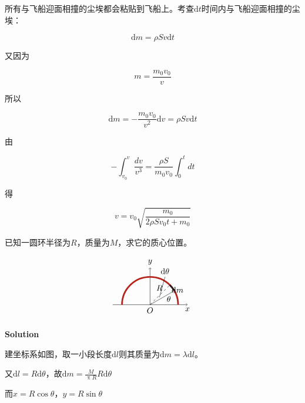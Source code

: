 \documentclass[
	12pt, %
	a4paper, %
]{myLegrandOrangeBook}
\newcommand{\rmd}{\mathrm{d}}
\begin{document}
    所有与飞船迎面相撞的尘埃都会粘贴到飞船上。考查\(\rmd t\)时间内与飞船迎面相撞的尘埃：

    \[
        \rmd m = \rho Sv\rmd t
    \]

    又因为

    \[
        m = \frac{m_0v_0}{v}
    \]

    所以

    \[
        \rmd m = -\frac{m_0v_0}{v^2} \rmd v = \rho Sv\rmd t
    \]

    由

    $$
        -\int_{v_0}^v \frac{d v}{v^3}=\frac{\rho S}{m_0 v_0} \int_0^t d t
    $$

    得

    $$
        v=v_0\sqrt{\frac{m_0}{2 \rho S v_0 t+m_0}}
    $$

    \begin{exercise}

    已知一圆环半径为\(R\)，质量为\(M\)，求它的质心位置。

    \[
        \centering
        \begin{tikzpicture}[scale=0.8]
            \coordinate[label=below:$x$] (x) at (2,0);
            \coordinate[label=above:$y$] (y) at (0,2);
            \coordinate[label=below:$O$] (O) at (0,0);
            \draw[->] (O) -- (y);
            \draw[->] (-2,0) -- (x);
            \draw[BrickRed, line width=2pt] (1.5,0) arc (0:180:1.5);
            \draw[Black, line width=2pt] (0.75*1.732,0.75) arc (30:45:1.5);
            \draw[dashed] (O) -- (0.75*1.414,0.75*1.414);
            \draw (O) -- (0.75*1.732,0.75);
            \coordinate[label=above:$\theta$] (theta) at (1,0);
            \coordinate[label=above:$R$] (R) at (0.5,0.6);
            \coordinate[label=above:$\rmd \theta$] (dtheta) at (0.8,1.5);
            \draw (0.5,0.4) -- (dtheta);
            \coordinate[label=right:$\rmd m$] (dm) at (1,0.8);
        \end{tikzpicture}
    \]

    \end{exercise}

    \textbf{Solution}
    \vspace{1em}

    建坐标系如图，取一小段长度\(\rmd l\)则其质量为\(\rmd m = \lambda \rmd l\)。

    又\(\rmd l = R \rmd \theta\)，故\(\rmd m = \frac{M}{\uppi R} R \rmd \theta\)

    而\(x = R\cos \theta\)，\(y = R\sin \theta\)
\end{document}
